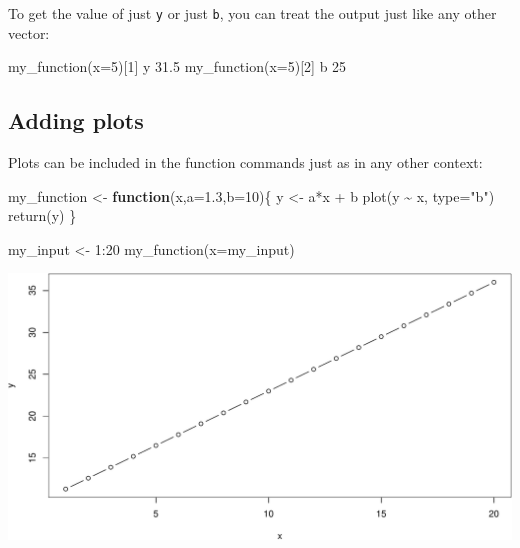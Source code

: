 \documentclass[
]{book}
\newenvironment{Shaded}{\begin{snugshade}}{\end{snugshade}}
\newcommand{\AttributeTok}[1]{\textcolor[rgb]{0.77,0.63,0.00}{#1}}
\newcommand{\ControlFlowTok}[1]{\textcolor[rgb]{0.13,0.29,0.53}{\textbf{#1}}}
\newcommand{\DecValTok}[1]{\textcolor[rgb]{0.00,0.00,0.81}{#1}}
\newcommand{\FloatTok}[1]{\textcolor[rgb]{0.00,0.00,0.81}{#1}}
\newcommand{\FunctionTok}[1]{\textcolor[rgb]{0.00,0.00,0.00}{#1}}
\newcommand{\NormalTok}[1]{#1}
\newcommand{\OtherTok}[1]{\textcolor[rgb]{0.56,0.35,0.01}{#1}}
\newcommand{\SpecialCharTok}[1]{\textcolor[rgb]{0.00,0.00,0.00}{#1}}
\newcommand{\StringTok}[1]{\textcolor[rgb]{0.31,0.60,0.02}{#1}}
\begin{document}
To get the value of just \texttt{y} or just \texttt{b}, you can treat the output just like any other vector:

\begin{Shaded}
\begin{Highlighting}[]
\FunctionTok{my\_function}\NormalTok{(}\AttributeTok{x=}\DecValTok{5}\NormalTok{)[}\DecValTok{1}\NormalTok{]}
\NormalTok{   y }
\FloatTok{31.5} 
\FunctionTok{my\_function}\NormalTok{(}\AttributeTok{x=}\DecValTok{5}\NormalTok{)[}\DecValTok{2}\NormalTok{]}
\NormalTok{ b }
\DecValTok{25} 
\end{Highlighting}
\end{Shaded}

\hypertarget{adding-plots}{%
\subsection*{Adding plots}\label{adding-plots}}

Plots can be included in the function commands just as in any other context:

\begin{Shaded}
\begin{Highlighting}[]
\NormalTok{my\_function }\OtherTok{\textless{}{-}} \ControlFlowTok{function}\NormalTok{(x,}\AttributeTok{a=}\FloatTok{1.3}\NormalTok{,}\AttributeTok{b=}\DecValTok{10}\NormalTok{)\{}
\NormalTok{  y }\OtherTok{\textless{}{-}}\NormalTok{ a}\SpecialCharTok{*}\NormalTok{x }\SpecialCharTok{+}\NormalTok{ b}
  \FunctionTok{plot}\NormalTok{(y }\SpecialCharTok{\textasciitilde{}}\NormalTok{ x, }\AttributeTok{type=}\StringTok{"b"}\NormalTok{)}
  \FunctionTok{return}\NormalTok{(y)}
\NormalTok{\}}
\end{Highlighting}
\end{Shaded}

\begin{Shaded}
\begin{Highlighting}[]
\NormalTok{my\_input }\OtherTok{\textless{}{-}} \DecValTok{1}\SpecialCharTok{:}\DecValTok{20}
\FunctionTok{my\_function}\NormalTok{(}\AttributeTok{x=}\NormalTok{my\_input)}
\end{Highlighting}
\end{Shaded}

\includegraphics{figures/unnamed-chunk-296-1.pdf}
\end{document}
